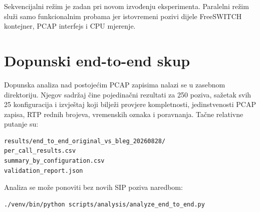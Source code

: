 Sekvencijalni režim je zadan pri novom izvođenju eksperimenta. Paralelni režim služi samo funkcionalnim probama jer istovremeni pozivi dijele FreeSWITCH kontejner, PCAP interfejs i CPU mjerenje.

\section{Dopunski end-to-end skup}

Dopunska analiza nad postojećim PCAP zapisima nalazi se u zasebnom direktoriju. Njegov sadržaj čine pojedinačni rezultati za 250 poziva, sažetak svih 25 konfiguracija i izvještaj koji bilježi provjere kompletnosti, jedinstvenosti PCAP zapisa, RTP rednih brojeva, vremenskih oznaka i poravnanja. Tačne relativne putanje su:

\begin{lstlisting}
results/end_to_end_original_vs_bleg_20260828/
per_call_results.csv
summary_by_configuration.csv
validation_report.json
\end{lstlisting}

Analiza se može ponoviti bez novih SIP poziva naredbom:

\begin{lstlisting}[language=bash]
./venv/bin/python scripts/analysis/analyze_end_to_end.py
\end{lstlisting}
